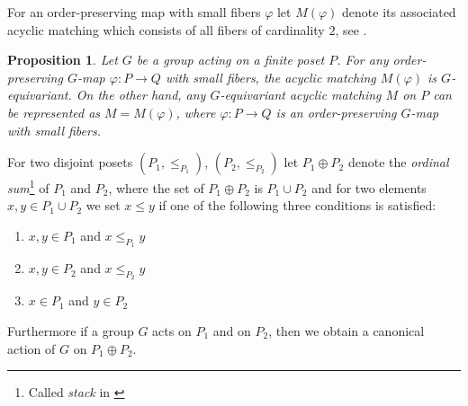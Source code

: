 \documentclass{elsarticle}
\newtheorem{prop}[df]{Proposition}
\begin{document}
For an order-preserving map with small fibers $\varphi$ let $M(\varphi)$ denote its associated acyclic matching which consists of all fibers of cardinality $2$, see \cite[Chapter 11]{buch}.
\begin{prop}
\label{smallfibers}
Let $G$ be a group acting on a finite poset $P$. For any order-preserving $G$-map $\varphi:P\longrightarrow Q$ with small fibers, the acyclic matching $M(\varphi)$ is $G$-equivariant. On the other hand, any $G$-equivariant acyclic matching $M$ on $P$ can be represented as $M=M(\varphi)$, where $\varphi:P\longrightarrow Q$ is an order-preserving $G$-map with small fibers.
\end{prop}
For two disjoint posets $(P_1,\leq_{P_1})$, $(P_2,\leq_{P_2})$ let $P_1\oplus P_2$ denote the \emph{ordinal sum}\footnote{Called \emph{stack} in \cite{buch}} of $P_1$ and $P_2$, where the set of $P_1\oplus P_2$ is $P_1\cup P_2$ and for two elements $x,y\in P_1\cup P_2$ we set $x\leq y$ if one of the following three conditions is satisfied:
\begin{enumerate}
\item $x,y\in P_1$ and $x\leq_{P_1} y$
\item $x,y\in P_2$ and $x\leq_{P_2} y$
\item $x\in P_1$ and $y\in P_2$
\end{enumerate}
Furthermore if a group $G$ acts on $P_1$ and on $P_2$, then we obtain a canonical action of $G$ on $P_1\oplus P_2$.
\end{document}
